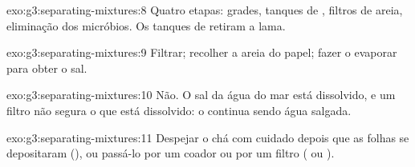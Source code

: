 \begin{solution}{exo:g3:separating-mixtures:8}
Quatro etapas: grades, tanques de , filtros de areia,
eliminação dos micróbios. Os tanques de  retiram a lama.
\end{solution}

\begin{solution}{exo:g3:separating-mixtures:9}
Filtrar; recolher a areia do papel; fazer o  evaporar para
obter o sal.
\end{solution}

\begin{solution}{exo:g3:separating-mixtures:10}
Não. O sal da água do mar está dissolvido, e um filtro não segura o que
está dissolvido: o  continua sendo água salgada.
\end{solution}

\begin{solution}{exo:g3:separating-mixtures:11}
Despejar o chá com cuidado depois que as folhas se depositaram
(), ou passá-lo por um coador ou por um filtro ( ou
).
\end{solution}
